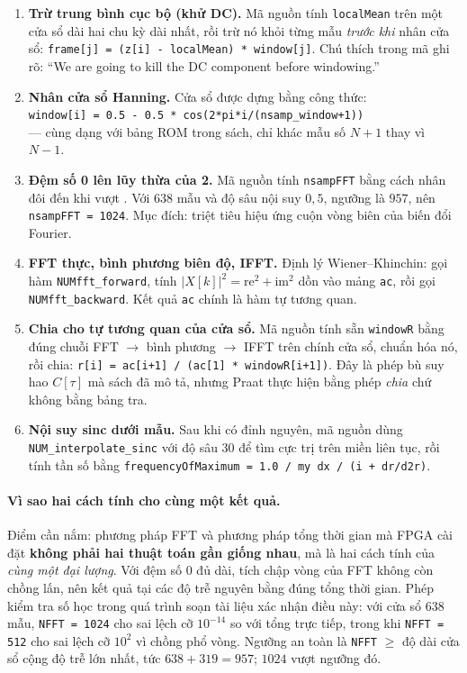 \documentclass[11pt,a4paper]{article}
\begin{document}
\begin{enumerate}
    \setlength{\itemsep}{1.5pt}
    \item \textbf{Trừ trung bình cục bộ (khử DC).} Mã nguồn tính \texttt{localMean} trên một cửa sổ dài hai chu kỳ dài nhất, rồi trừ nó khỏi từng mẫu \emph{trước khi} nhân cửa sổ: \texttt{frame[j] = (z[i] - localMean) * window[j]}. Chú thích trong mã ghi rõ: ``We are going to kill the DC component before windowing.''
    \item \textbf{Nhân cửa sổ Hanning.} Cửa sổ được dựng bằng công thức:\\\texttt{window[i] = 0.5 - 0.5 * cos(2*pi*i/(nsamp\_window+1))}\\--- cùng dạng với bảng ROM trong sách, chỉ khác mẫu số $N+1$ thay vì $N-1$.
    \item \textbf{Đệm số 0 lên lũy thừa của 2.} Mã nguồn tính \texttt{nsampFFT} bằng cách nhân đôi đến khi vượt . Với $638$ mẫu và độ sâu nội suy $0{,}5$, ngưỡng là $957$, nên \texttt{nsampFFT = 1024}. Mục đích: triệt tiêu hiệu ứng cuộn vòng biên của biến đổi Fourier.
    \item \textbf{FFT thực, bình phương biên độ, IFFT.} Định lý Wiener--Khinchin: gọi hàm \texttt{NUMfft\_forward}, tính $|X[k]|^2 = \text{re}^2 + \text{im}^2$ dồn vào mảng \texttt{ac}, rồi gọi \texttt{NUMfft\_backward}. Kết quả \texttt{ac} chính là hàm tự tương quan.
    \item \textbf{Chia cho tự tương quan của cửa sổ.} Mã nguồn tính sẵn \texttt{windowR} bằng đúng chuỗi FFT $\to$ bình phương $\to$ IFFT trên chính cửa sổ, chuẩn hóa nó, rồi chia: \texttt{r[i] = ac[i+1] / (ac[1] * windowR[i+1])}. Đây là phép bù suy hao $C[\tau]$ mà sách đã mô tả, nhưng Praat thực hiện bằng phép \emph{chia} chứ không bằng bảng tra.
    \item \textbf{Nội suy sinc dưới mẫu.} Sau khi có đỉnh nguyên, mã nguồn dùng \texttt{NUM\_interpolate\_sinc} với độ sâu $30$ để tìm cực trị trên miền liên tục, rồi tính tần số bằng \texttt{frequencyOfMaximum = 1.0 / my dx / (i + dr/d2r)}.
\end{enumerate}

\paragraph{Vì sao hai cách tính cho cùng một kết quả.}
Điểm cần nắm: phương pháp FFT và phương pháp tổng thời gian mà FPGA cài đặt \textbf{không phải hai thuật toán gần giống nhau}, mà là hai cách tính của \emph{cùng một đại lượng}. Với đệm số 0 đủ dài, tích chập vòng của FFT không còn chồng lấn, nên kết quả tại các độ trễ nguyên bằng đúng tổng thời gian. Phép kiểm tra số học trong quá trình soạn tài liệu xác nhận điều này: với cửa sổ $638$ mẫu, \texttt{NFFT = 1024} cho sai lệch cỡ $10^{-14}$ so với tổng trực tiếp, trong khi \texttt{NFFT = 512} cho sai lệch cỡ $10^{2}$ vì chồng phổ vòng. Ngưỡng an toàn là \texttt{NFFT} $\ge$ độ dài cửa sổ cộng độ trễ lớn nhất, tức $638 + 319 = 957$; $1024$ vượt ngưỡng đó.
\end{document}
